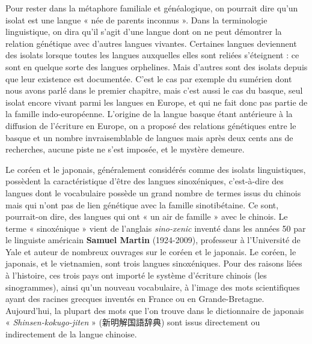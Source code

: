 Pour rester dans la métaphore familiale et généalogique, on pourrait dire qu’un isolat est une langue « née de parents inconnus ». Dans la terminologie linguistique, on dira qu’il s’agit d’une langue dont on ne peut démontrer la relation génétique avec d’autres langues vivantes. Certaines langues deviennent des isolats lorsque toutes les langues auxquelles elles sont reliées s’éteignent : ce sont en quelque sorte des langues orphelines. Mais d’autres sont des isolats depuis que leur existence est documentée. C’est le cas par exemple du sumérien dont nous avons parlé dans le premier chapitre, mais c’est aussi le cas du basque, seul isolat encore vivant parmi les langues en Europe, et qui ne fait donc pas partie de la famille indo-européenne. L’origine de la langue basque étant antérieure à la diffusion de l’écriture en Europe, on a proposé des relations génétiques entre le
basque et un nombre invraisemblable de langues mais après deux cents ans de recherches, aucune piste ne s’est imposée, et le mystère demeure.

Le coréen et le japonais, généralement considérés comme des isolats linguistiques, possèdent la caractéristique d’être des langues sinoxéniques, c’est-à-dire des langues dont le vocabulaire possède un grand nombre de termes issus du chinois mais qui n’ont pas de lien génétique avec la famille sinotibétaine. Ce sont, pourrait-on dire, des langues qui ont « un air de famille » avec le chinois. Le terme « sinoxénique » vient de l’anglais \textit{sino-xenic} inventé dans les années 50 par le linguiste américain \textbf{Samuel Martin} (1924-2009), professeur à l’Université de Yale et auteur de nombreux ouvrages sur le coréen et le japonais. Le coréen, le japonais, et le vietnamien, sont trois langues sinoxéniques. Pour des raisons liées à l’histoire, ces trois pays ont importé le système d’écriture chinois (les sinogrammes), ainsi qu’un nouveau vocabulaire, à l’image des mots scientifiques ayant des racines grecques inventés en France ou en Grande-Bretagne. Aujourd’hui, la plupart des mots que l’on trouve dans le dictionnaire de japonais « \textit{Shinsen-kokugo-jiten} » (新明解国語辞典) sont issus directement ou indirectement de la langue chinoise.

